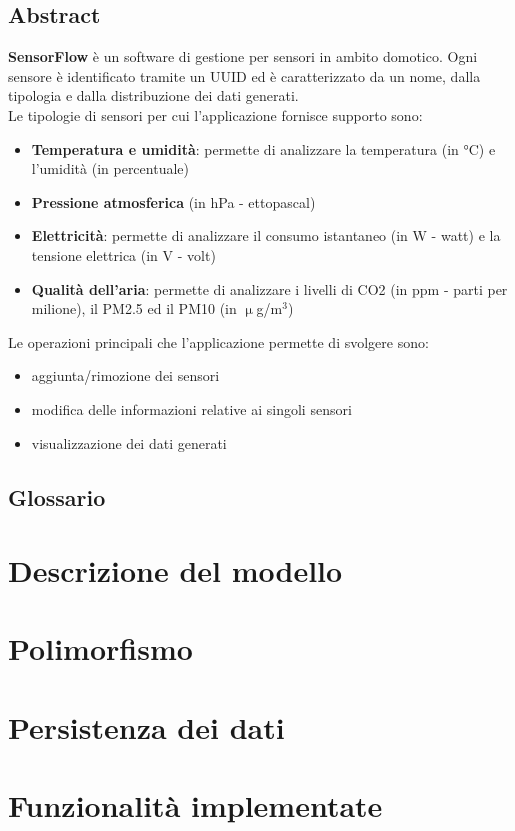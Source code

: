 \documentclass[a4paper, 10pt]{article}
\begin{document}
    \subsection{Abstract}
    \textbf{SensorFlow} è un software di gestione per sensori in ambito domotico. Ogni sensore è identificato tramite un UUID ed è caratterizzato da un nome, dalla tipologia e dalla distribuzione dei dati generati.\\
    Le tipologie di sensori per cui l'applicazione fornisce supporto sono:
    \begin{itemize}
        \item \textbf{Temperatura e umidità}: permette di analizzare la temperatura (in °C) e l'umidità (in percentuale)
        \item \textbf{Pressione atmosferica} (in hPa - ettopascal) 
        \item \textbf{Elettricità}: permette di analizzare il consumo istantaneo (in W - watt) e la tensione elettrica (in V - volt)
        \item \textbf{Qualità dell'aria}: permette di analizzare i livelli di CO2 (in ppm - parti per milione), il PM2.5 ed il PM10 (in $\upmu$g/m$^3$)
    \end{itemize}
    Le operazioni principali che l'applicazione permette di svolgere sono:
    \begin{itemize}
        \item aggiunta/rimozione dei sensori
        \item modifica delle informazioni relative ai singoli sensori
        \item visualizzazione dei dati generati
    \end{itemize}
    \subsection{Glossario}
    \section*{Descrizione del modello}
    \section*{Polimorfismo}
    \section*{Persistenza dei dati}
    \section*{Funzionalità implementate}
\end{document}
